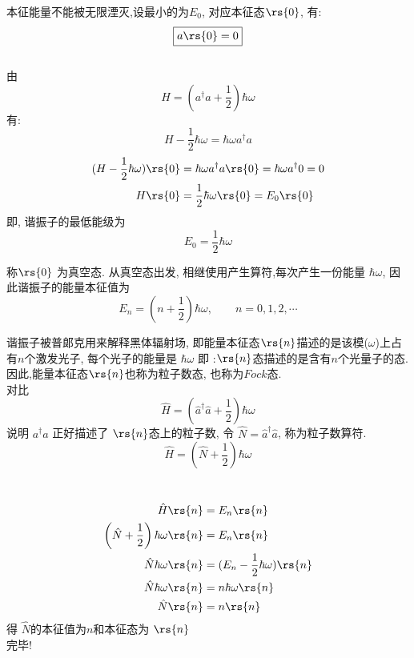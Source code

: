 \begin{frame}
本征能量不能被无限湮灭,设最小的为$E_0$, 对应本征态$\rs{0}$, 有:
\[ \boxed{a \rs{0}= 0 }\]
~~\\ 
由 \[H=(a ^\dagger a + \frac{1}{2})\hbar \omega\]  
有: 
\[H-\frac{1}{2}\hbar \omega=\hbar \omega a ^\dagger a \] 
\[ 
\begin{aligned}
(H-\frac{1}{2}\hbar \omega) \rs{0} &= \hbar \omega a ^\dagger a \rs{0} = \hbar \omega a ^\dagger 0 = 0 \\ 
H \rs{0} &= \frac{1}{2}\hbar \omega \rs{0}=E_0 \rs{0} 
\end{aligned}
\] 
即, 谐振子的最低能级为
\[ \boxed{E_0=\dfrac{1}{2}\hbar \omega} \]
\end{frame}


\begin{frame}
称$\rs{0}$ 为真空态. 从真空态出发, 相继使用产生算符,每次产生一份能量 $ \hbar \omega$, 因此谐振子的能量本征值为
\[\boxed{E_n = (n+\frac{1}{2})\hbar \omega, \qquad n=0,1,2, \cdots}  \] 

谐振子被普郞克用来解释黑体辐射场, 即能量本征态$\rs{n}$描述的是该模($\omega$)上占有$n$个激发光子, 每个光子的能量是 $\hbar \omega$ 即 :$\rs{n}$态描述的是含有$n$个光量子的态. 因此,能量本征态$\rs{n}$也称为粒子数态, 也称为$Fock$态. \\

对比 
\[  \hat{H}= \left(\hat{a}^\dagger \hat{a} + \frac{1 }{2}\right) \hbar \omega \]
说明 $a^\dagger a$ 正好描述了 $\rs{n}$态上的粒子数, 令 $\hat{N}=\hat{a}^\dagger \hat{a}$, 称为粒子数算符.
\[ \hat{H}= \left(\hat{N} + \frac{1 }{2}\right) \hbar \omega \] 
\end{frame}

\begin{frame}
  \解~ \[ 
  \begin{aligned}
      \hat{H}\rs{n} & =E_n \rs{n}  \\ 
      \left(\hat{N} + \frac{1 }{2}\right) \hbar \omega \rs{n} & =E_n \rs{n}  \\ 
     \hat{N} \hbar \omega \rs{n} & =(E_n-\frac{1}{2} \hbar \omega) \rs{n}  \\ 
     \hat{N} \hbar \omega \rs{n} & = n \hbar \omega \rs{n}  \\ 
     \hat{N}   \rs{n} & = n  \rs{n}  \\ 
  \end{aligned} 
  \]
  得 $\hat{N}$的本征值为$n$和本征态为 $\rs{n}$ \\ 
  完毕!
\end{frame}

